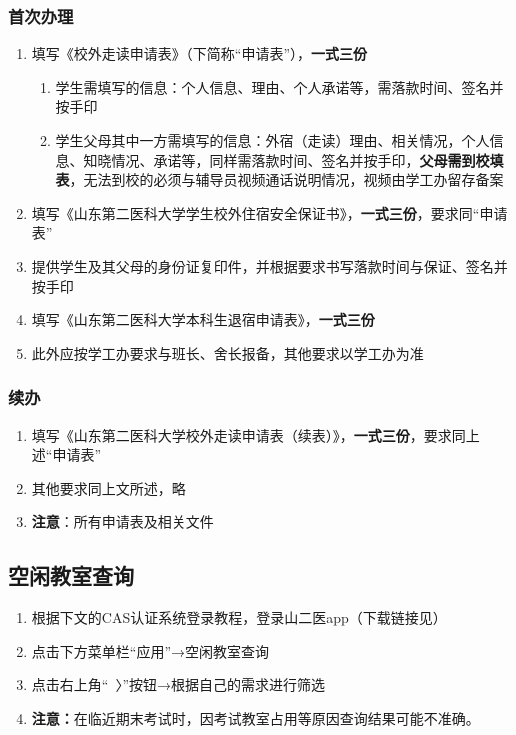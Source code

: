 \subsubsection[首次办理]{首次办理}
\begin{enumerate}
    \item 填写《校外走读申请表》（下简称“申请表”），\textbf{一式三份}
    \begin{enumerate}
        \item 学生需填写的信息：个人信息、理由、个人承诺等，需落款时间、签名并按手印
        \item 学生父母其中一方需填写的信息：外宿（走读）理由、相关情况，个人信息、知晓情况、承诺等，同样需落款时间、签名并按手印，\textbf{父母需到校填表}，无法到校的必须与辅导员视频通话说明情况，视频由学工办留存备案
    \end{enumerate}
    \item 填写《山东第二医科大学学生校外住宿安全保证书》，\textbf{一式三份}，要求同“申请表”
    \item 提供学生及其父母的身份证复印件，并根据要求书写落款时间与保证、签名并按手印
    \item 填写《山东第二医科大学本科生退宿申请表》，\textbf{一式三份}
    \item 此外应按学工办要求与班长、舍长报备，其他要求以学工办为准
\end{enumerate}

\subsubsection[续办]{续办}
\begin{enumerate}
    \item 填写《山东第二医科大学校外走读申请表（续表）》，\textbf{一式三份}，要求同上述“申请表”
    \item 其他要求同上文所述，略
    \item \textbf{注意}：所有申请表及相关文件
\end{enumerate}

\subsection[空闲教室查询]{空闲教室查询}
\label{spare_classroom}
\begin{enumerate}
    \item 根据下文的CAS认证系统登录教程，登录山二医app（下载链接见）
    \item 点击下方菜单栏“应用”→空闲教室查询
    \item 点击右上角“\ 〉”按钮→根据自己的需求进行筛选
    \item \textbf{注意：}在临近期末考试时，因考试教室占用等原因查询结果可能不准确。
\end{enumerate}

